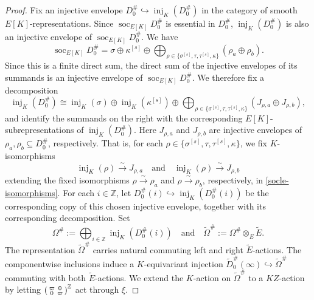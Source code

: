 \documentclass[a4paper,10pt,twoside]{amsart}
\theoremstyle{definition}
\numberwithin{equation}{section}
\begin{document}
\begin{proof}

Fix an injective envelope $D_0^\#\hookrightarrow \operatorname{inj}_K(D_0^\#)
$ in the category of smooth \(E[K]\)-representations. Since
\(\operatorname{soc}_{E[K]} D_0^\#\) is essential in \(D_0^\#\),
\(\operatorname{inj}_K(D_0^\#)\) is also an injective envelope of
\(\operatorname{soc}_{E[K]} D_0^\#\). We have
\[
\operatorname{soc}_{E[K]} D_0^\#
=
\sigma\oplus\kappa^{[s]}
\oplus
\bigoplus_{\rho\in\{\sigma^{[s]},\tau,\tau^{[s]},\kappa\}}
(\rho_a\oplus\rho_b).
\]
Since this is a finite direct sum, the direct sum of the injective
envelopes of its summands is an injective envelope of
\(\operatorname{soc}_{E[K]} D_0^\#\). We therefore fix a decomposition
\[
\operatorname{inj}_K(D_0^\#)
\cong
\operatorname{inj}_K(\sigma)
\oplus
\operatorname{inj}_K(\kappa^{[s]})
\oplus
\bigoplus_{\rho\in\{\sigma^{[s]},\tau,\tau^{[s]},\kappa\}}
\left(J_{\rho,a}\oplus J_{\rho,b}\right),
\]
and identify the summands on the right with the corresponding
\(E[K]\)-subrepresentations of \(\operatorname{inj}_K(D_0^\#)\).
Here \(J_{\rho,a}\) and \(J_{\rho,b}\) are injective envelopes of \(\rho_a,\rho_b\subseteq D_0^\#\), respectively. That is, for each
\(\rho\in\{\sigma^{[s]},\tau,\tau^{[s]},\kappa\}\), we fix
\(K\)-isomorphisms
\begin{equation}\label{Jisos}
\operatorname{inj}_K(\rho)
\xrightarrow{\sim} J_{\rho,a}\quad \text{and}\quad \operatorname{inj}_K(\rho)
\xrightarrow{\sim} J_{\rho,b}
\end{equation}
extending the fixed isomorphisms \(\rho\xrightarrow{\sim}\rho_a\) and
\(\rho\xrightarrow{\sim}\rho_b\), respectively, in \eqref{socle-isomorphisms}. For each \(i\in\mathbb Z\), let \(
D_0^\#(i)\hookrightarrow
\operatorname{inj}_K(D_0^\#(i))
\) be the corresponding copy of this chosen injective envelope, together
with its corresponding decomposition. Set
\[
\Omega^\#
:=
\bigoplus_{i\in\mathbb Z}
\operatorname{inj}_K(D_0^\#(i))
\quad \text{and} \quad
\widetilde\Omega^\#
:=
\Omega^\#\otimes_E\widetilde E.
\]
The representation \(\widetilde\Omega^\#\) carries natural commuting
left and right \(\widetilde E\)-actions. The componentwise inclusions
induce a \(K\)-equivariant injection
\(
\widetilde D_0^\#(\infty)
\hookrightarrow
\widetilde\Omega^\#
\) commuting with both \(\widetilde E\)-actions. We extend the
\(K\)-action on \(\widetilde\Omega^\#\) to a \(KZ\)-action by letting
\(
\begin{psmallmatrix}
\varpi&0\\
0&\varpi
\end{psmallmatrix}^{\mathbb{Z}}
\) act through \(\xi\).



\end{proof}
\end{document}
